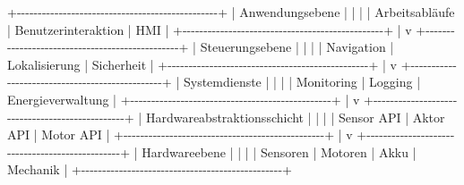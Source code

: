 \documentclass[
  a4paper,
  12pt,
  DIV=12,        %
  parskip=half,  %
  headings=small %
]{scrartcl}
\theoremstyle{definition}
\theoremstyle{definition}
\newenvironment{Shaded}{}{}
\newcommand{\NormalTok}[1]{#1}
\begin{document}
\begin{Shaded}
\begin{Highlighting}[]
\NormalTok{+{-}{-}{-}{-}{-}{-}{-}{-}{-}{-}{-}{-}{-}{-}{-}{-}{-}{-}{-}{-}{-}{-}{-}{-}{-}{-}{-}{-}{-}{-}{-}{-}{-}{-}{-}{-}{-}{-}{-}{-}{-}{-}{-}{-}{-}{-}{-}{-}+}
\NormalTok{|                Anwendungsebene                 |}
\NormalTok{|                                                |}
\NormalTok{|  Arbeitsabläufe | Benutzerinteraktion | HMI    |}
\NormalTok{+{-}{-}{-}{-}{-}{-}{-}{-}{-}{-}{-}{-}{-}{-}{-}{-}{-}{-}{-}{-}{-}{-}{-}{-}{-}{-}{-}{-}{-}{-}{-}{-}{-}{-}{-}{-}{-}{-}{-}{-}{-}{-}{-}{-}{-}{-}{-}{-}+}
\NormalTok{                     |}
\NormalTok{                     v}
\NormalTok{+{-}{-}{-}{-}{-}{-}{-}{-}{-}{-}{-}{-}{-}{-}{-}{-}{-}{-}{-}{-}{-}{-}{-}{-}{-}{-}{-}{-}{-}{-}{-}{-}{-}{-}{-}{-}{-}{-}{-}{-}{-}{-}{-}{-}{-}{-}{-}{-}+}
\NormalTok{|              Steuerungsebene                   |}
\NormalTok{|                                                |}
\NormalTok{| Navigation | Lokalisierung | Sicherheit        |}
\NormalTok{+{-}{-}{-}{-}{-}{-}{-}{-}{-}{-}{-}{-}{-}{-}{-}{-}{-}{-}{-}{-}{-}{-}{-}{-}{-}{-}{-}{-}{-}{-}{-}{-}{-}{-}{-}{-}{-}{-}{-}{-}{-}{-}{-}{-}{-}{-}{-}{-}+}
\NormalTok{                     |}
\NormalTok{                     v}
\NormalTok{+{-}{-}{-}{-}{-}{-}{-}{-}{-}{-}{-}{-}{-}{-}{-}{-}{-}{-}{-}{-}{-}{-}{-}{-}{-}{-}{-}{-}{-}{-}{-}{-}{-}{-}{-}{-}{-}{-}{-}{-}{-}{-}{-}{-}{-}{-}{-}{-}+}
\NormalTok{|             Systemdienste                      |}
\NormalTok{|                                                |}
\NormalTok{| Monitoring | Logging | Energieverwaltung       |}
\NormalTok{+{-}{-}{-}{-}{-}{-}{-}{-}{-}{-}{-}{-}{-}{-}{-}{-}{-}{-}{-}{-}{-}{-}{-}{-}{-}{-}{-}{-}{-}{-}{-}{-}{-}{-}{-}{-}{-}{-}{-}{-}{-}{-}{-}{-}{-}{-}{-}{-}+}
\NormalTok{                     |}
\NormalTok{                     v}
\NormalTok{+{-}{-}{-}{-}{-}{-}{-}{-}{-}{-}{-}{-}{-}{-}{-}{-}{-}{-}{-}{-}{-}{-}{-}{-}{-}{-}{-}{-}{-}{-}{-}{-}{-}{-}{-}{-}{-}{-}{-}{-}{-}{-}{-}{-}{-}{-}{-}{-}+}
\NormalTok{|        Hardwareabstraktionsschicht             |}
\NormalTok{|                                                |}
\NormalTok{| Sensor API | Aktor API | Motor API             |}
\NormalTok{+{-}{-}{-}{-}{-}{-}{-}{-}{-}{-}{-}{-}{-}{-}{-}{-}{-}{-}{-}{-}{-}{-}{-}{-}{-}{-}{-}{-}{-}{-}{-}{-}{-}{-}{-}{-}{-}{-}{-}{-}{-}{-}{-}{-}{-}{-}{-}{-}+}
\NormalTok{                     |}
\NormalTok{                     v}
\NormalTok{+{-}{-}{-}{-}{-}{-}{-}{-}{-}{-}{-}{-}{-}{-}{-}{-}{-}{-}{-}{-}{-}{-}{-}{-}{-}{-}{-}{-}{-}{-}{-}{-}{-}{-}{-}{-}{-}{-}{-}{-}{-}{-}{-}{-}{-}{-}{-}{-}+}
\NormalTok{|                Hardwareebene                   |}
\NormalTok{|                                                |}
\NormalTok{| Sensoren | Motoren | Akku | Mechanik           |}
\NormalTok{+{-}{-}{-}{-}{-}{-}{-}{-}{-}{-}{-}{-}{-}{-}{-}{-}{-}{-}{-}{-}{-}{-}{-}{-}{-}{-}{-}{-}{-}{-}{-}{-}{-}{-}{-}{-}{-}{-}{-}{-}{-}{-}{-}{-}{-}{-}{-}{-}+}
\end{Highlighting}
\end{Shaded}
\end{document}
